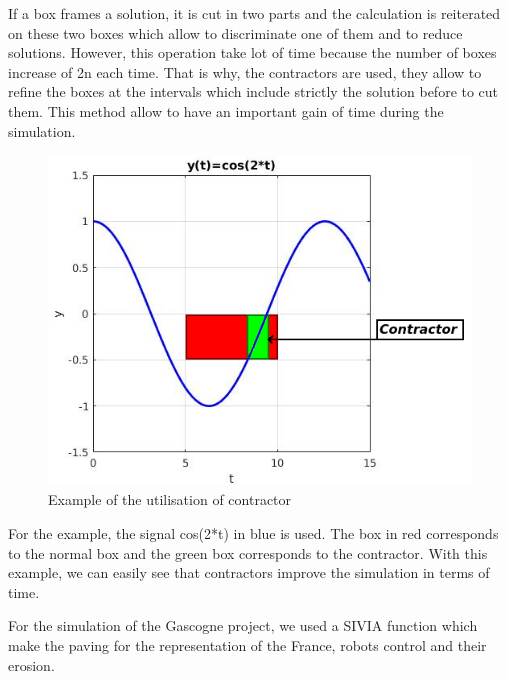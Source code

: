 \documentclass[a4paper,12pt]{report}
\begin{document}
	\newpage

	If a box frames a solution, it is cut in two parts and the calculation is reiterated on these two boxes which allow to discriminate one of them and to reduce solutions. However, this operation take lot of time because the number of boxes increase of  2n each time. That is why, the contractors are used, they allow to refine the boxes at the intervals which include strictly the solution before to cut them. This method allow to have an important gain of time during the simulation. 

	\begin{figure}[!h] 
    \center
    	\includegraphics[scale=0.8]{Contractor.png} 
    	\caption{Example of the utilisation of contractor} 
    \label{Contractor}
	\end{figure} 
	
	For the example, the signal cos(2*t) in blue is used. The box in red corresponds to the normal box and the green box corresponds to the contractor. With this example, we can easily see that contractors improve  the simulation in terms of time. 

	\vspace{0.5 cm}
	
	For the simulation of the Gascogne project, we used a SIVIA function which make the paving for the representation of the France, robots control and their erosion.
	
	
\end{document}
